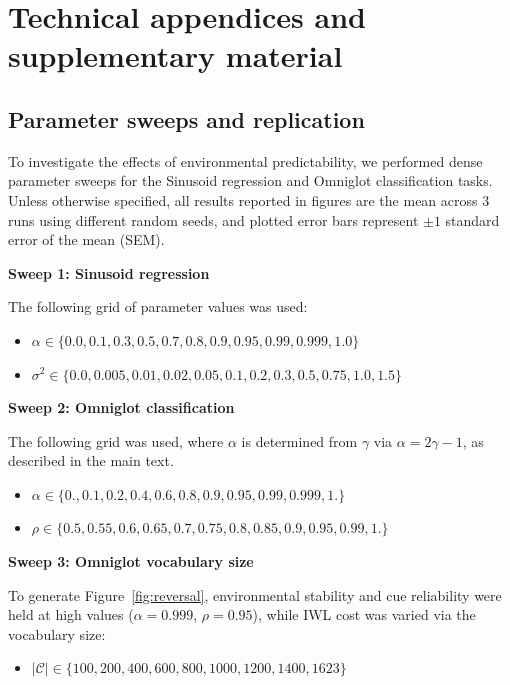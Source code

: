 \appendix

\section{Technical appendices and supplementary material}
\label{sec:appendix}

\subsection{Parameter sweeps and replication}
\label{sec:sweep}

To investigate the effects of environmental predictability, we performed dense parameter sweeps for the Sinusoid regression and Omniglot classification tasks.
Unless otherwise specified, all results reported in figures are the mean across 3 runs using different random seeds, and plotted error bars represent $\pm 1$ standard error of the mean (SEM).

\textbf{Sweep 1: Sinusoid regression}

The following grid of parameter values was used:
\begin{itemize}
    \item $\alpha \in \{0.0, 0.1, 0.3, 0.5, 0.7, 0.8, 0.9, 0.95, 0.99, 0.999, 1.0 \}$
    \item $\sigma^2 \in \{0.0, 0.005, 0.01, 0.02, 0.05, 0.1, 0.2, 0.3, 0.5, 0.75, 1.0, 1.5\}$
\end{itemize}

\textbf{Sweep 2: Omniglot classification}

The following grid was used, where $\alpha$ is determined from $\gamma$ via $\alpha = 2\gamma - 1$, as described in the main text.
\begin{itemize}
    \item $\alpha \in \{ 0.   , 0.1  , 0.2  , 0.4  , 0.6  , 0.8  , 0.9  , 0.95 , 0.99 , 0.999, 1. \}$
    \item $\rho \in \{0.5 , 0.55, 0.6 , 0.65, 0.7 , 0.75, 0.8 , 0.85, 0.9 , 0.95, 0.99, 1.  \}$
\end{itemize}

\textbf{Sweep 3: Omniglot vocabulary size}

To generate Figure~\ref{fig:reversal}, environmental stability and cue reliability were held at high values ($\alpha=0.999$, $\rho = 0.95$), while IWL cost was varied via the vocabulary size:
\begin{itemize}
    \item $|\mathcal{C}| \in \{100, 200, 400, 600, 800, 1000, 1200, 1400, 1623\}$
\end{itemize}

